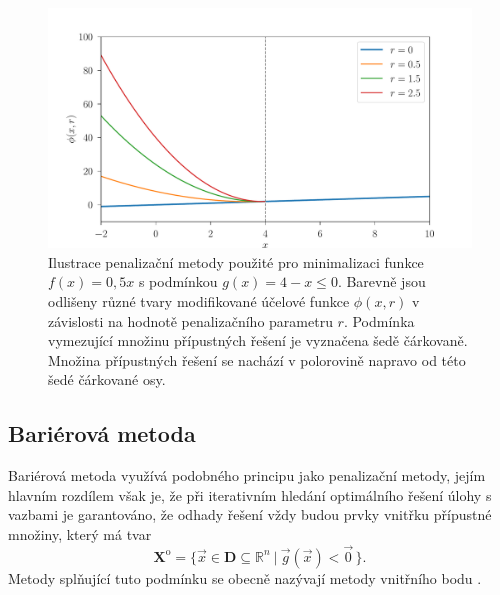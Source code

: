 \begin{figure}[H]
	\centering
	\includegraphics[width=1.0\textwidth]{Images/penalty.pdf}
	\vspace{0.25cm}
	\caption{Ilustrace penalizační metody použité pro minimalizaci funkce $ f(x) = 0,5x $ s podmínkou $ g(x) = 4 - x \leq 0 $. Barevně jsou odlišeny různé tvary modifikované účelové funkce $\phi (x, r)  $ v závislosti na hodnotě penalizačního parametru $ r $. Podmínka vymezující množinu přípustných řešení je vyznačena šedě čárkovaně. Množina přípustných řešení se nachází v polorovině napravo od této šedé čárkované osy.}
	\label{fig:penalty}
\end{figure}

\subsection{Bariérová metoda}\label{barrier method}
Bariérová metoda využívá podobného principu jako penalizační metody, jejím hlavním rozdílem však je, že při iterativním hledání optimálního řešení úlohy s vazbami je garantováno, že odhady řešení vždy budou prvky vnitřku přípustné množiny, který má tvar
\begin{equation}
\mathbf{X}^{\mathrm{o}} = \big\{ \vec{x} \in \mathbf{D} \subseteq \mathbb{R}^n \ | \ \vec{g} (\vec{x}) < \vec{0} \, \big\}.
\end{equation}
Metody splňující tuto podmínku se obecně nazývají metody vnitřního bodu \cite{non-linear-textbook}.

